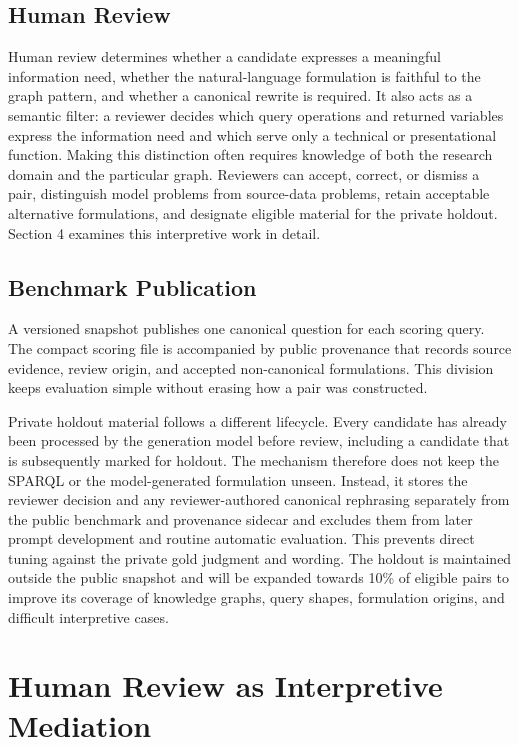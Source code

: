 \subsection{Human Review}\label{human-review}

Human review determines whether a candidate expresses a meaningful information need, whether the natural-language formulation is faithful to the graph pattern, and whether a canonical rewrite is required. It also acts as a semantic filter: a reviewer decides which query operations and returned variables express the information need and which serve only a technical or presentational function. Making this distinction often requires knowledge of both the research domain and the particular graph. Reviewers can accept, correct, or dismiss a pair, distinguish model problems from source-data problems, retain acceptable alternative formulations, and designate eligible material for the private holdout. Section 4 examines this interpretive work in detail.

\subsection{Benchmark Publication}\label{benchmark-publication}

A versioned snapshot publishes one canonical question for each scoring query. The compact scoring file is accompanied by public provenance that records source evidence, review origin, and accepted non-canonical formulations. This division keeps evaluation simple without erasing how a pair was constructed.

Private holdout material follows a different lifecycle. Every candidate has already been processed by the generation model before review, including a candidate that is subsequently marked for holdout. The mechanism therefore does not keep the SPARQL or the model-generated formulation unseen. Instead, it stores the reviewer decision and any reviewer-authored canonical rephrasing separately from the public benchmark and provenance sidecar and excludes them from later prompt development and routine automatic evaluation. This prevents direct tuning against the private gold judgment and wording. The holdout is maintained outside the public snapshot and will be expanded towards 10\% of eligible pairs to improve its coverage of knowledge graphs, query shapes, formulation origins, and difficult interpretive cases.

\section{Human Review as Interpretive Mediation}\label{human-review-as-interpretive-mediation}

